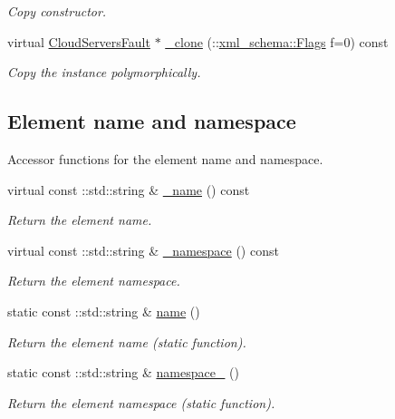 \begin{DoxyCompactItemize}
\begin{DoxyCompactList}\small\item\em Copy constructor. \item\end{DoxyCompactList}\item 
virtual \hyperlink{classopenstack_1_1xml_1_1CloudServersFault}{CloudServersFault} $\ast$ \hyperlink{classopenstack_1_1xml_1_1CloudServersFault_afc1e6223dbe4a20409860c7308d1bf25}{\_\-clone} (::\hyperlink{namespacexml__schema_affb4c227cbd9aa7453dd1dc5a1401943}{xml\_\-schema::Flags} f=0) const 
\begin{DoxyCompactList}\small\item\em Copy the instance polymorphically. \item\end{DoxyCompactList}\end{DoxyCompactItemize}
\subsection*{Element name and namespace}
\label{_amgrpd4b5b61f6e07390f4af2465e04571f34}
Accessor functions for the element name and namespace. \begin{DoxyCompactItemize}
\item 
virtual const ::std::string \& \hyperlink{classopenstack_1_1xml_1_1CloudServersFault_acd2051f57cecabb88dfb55b50f6ab5dc}{\_\-name} () const 
\begin{DoxyCompactList}\small\item\em Return the element name. \item\end{DoxyCompactList}\item 
virtual const ::std::string \& \hyperlink{classopenstack_1_1xml_1_1CloudServersFault_ab5083697911b6f57eb90bd033f9ab709}{\_\-namespace} () const 
\begin{DoxyCompactList}\small\item\em Return the element namespace. \item\end{DoxyCompactList}\item 
static const ::std::string \& \hyperlink{classopenstack_1_1xml_1_1CloudServersFault_ac531a61c242af154459f70f5a6270cea}{name} ()
\begin{DoxyCompactList}\small\item\em Return the element name (static function). \item\end{DoxyCompactList}\item 
static const ::std::string \& \hyperlink{classopenstack_1_1xml_1_1CloudServersFault_a34497b42c69e20acf374bdd1cfe95074}{namespace\_\-} ()
\begin{DoxyCompactList}\small\item\em Return the element namespace (static function). \item\end{DoxyCompactList}\end{DoxyCompactItemize}


